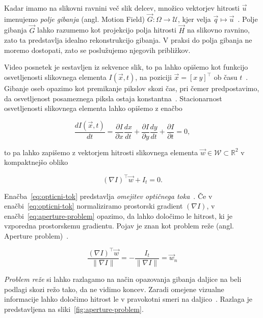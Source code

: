 Kadar imamo na slikovni ravnini več slik delcev, množico vektorjev hitrosti $\vec{u}$ imenujemo \emph{polje gibanja} (angl. Motion Field) $\vec{G} : \varOmega \to \mathcal{U}$, kjer velja $ \vec{q} \mapsto \vec{u}$~\cite{trucco1998introductory}. Polje gibanja $\vec{G}$ lahko razumemo kot projekcijo polja hitrosti $\vec{H}$ na slikovno ravnino, zato ta predstavlja idealno rekonstrukcijo gibanja. V praksi do polja gibanja ne moremo dostopati, zato se poslužujemo njegovih približkov.  

Video posnetek je sestavljen iz sekvence slik, to pa lahko opišemo kot funkcijo osvetljenosti slikovnega elementa $I(\vec{x},t)$, na poziciji $\vec{x} = [x~y]^\top$ ob času $t$~\cite{wedel2011stereo}. Gibanje oseb opazimo kot premikanje pikslov skozi čas, pri čemer predpostavimo, da osvetljenost posameznega piksla ostaja konstantna~\cite{trucco1998introductory}. Stacionarnost osvetljenosti slikovnega elementa lahko opišemo z enačbo  

\begin{equation}
	\frac{d I(\vec{x}, t)}{dt} = \frac{\partial I}{\partial x} \frac{dx}{dt} + \frac{\partial I}{\partial y} \frac{dy}{dt} + \frac{\partial I}{\partial t} = 0,
\end{equation}

to pa lahko zapišemo z vektorjem hitrosti slikovnega elementa $\vec{w} \in \mathcal{W} \subset \mathbb{R}^2$ v kompaktnejšo obliko

\begin{equation}\label{eq:opticni-tok}
	(\nabla I)^\top \vec{w} + I_t = 0.
\end{equation}

Enačba~\eqref{eq:opticni-tok} predstavlja \emph{omejitev optičnega toka}~\cite{trucco1998introductory}. Če v enačbi~\eqref{eq:opticni-tok} normaliziramo prostorski gradient $(\nabla I)$, v enačbi~\eqref{eq:aperture-problem} opazimo, da lahko  določimo le hitrost, ki je vzporedna prostorskemu gradientu. Pojav je znan kot problem reže (angl. Aperture problem)~\cite{trucco1998introductory}. 

\begin{equation}\label{eq:aperture-problem}
	\frac{(\nabla I)^\top \vec{w}}{\| \nabla I \|} = - \frac{I_t}{\| \nabla I \|} = \vec{w}_n
\end{equation}

\emph{Problem reže} si lahko razlagamo na način opazovanja gibanja daljice na beli podlagi skozi režo tako, da ne vidimo koncev. Zaradi omejene vizualne informacije lahko določimo hitrost le v pravokotni smeri na daljico~\cite{trucco1998introductory}. Razlaga je predstavljena na sliki~\ref{fig:aperture-problem}.




